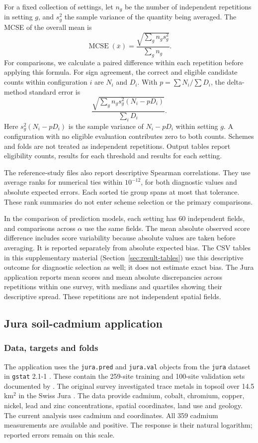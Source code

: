 \documentclass[11pt,a4paper]{article}
\begin{document}
For a fixed collection of settings, let $n_g$ be the number of independent repetitions in setting $g$, and $s_g^2$ the sample variance of the quantity being averaged. The MCSE of the overall mean is
\[
\operatorname{MCSE}(\overline x)=\frac{\sqrt{\sum_g n_g s_g^2}}{\sum_g n_g}.
\]
For comparisons, we calculate a paired difference within each repetition before applying this formula. For sign agreement, the correct and eligible candidate counts within configuration $i$ are $N_i$ and $D_i$. With $p=\sum N_i/\sum D_i$, the delta-method standard error is
\[\frac{\sqrt{\sum_g n_gs_g^2(N_i-pD_i)}}{\sum_i D_i}.\]
Here $s_g^2(N_i-pD_i)$ is the sample variance of $N_i-pD_i$ within setting $g$. A configuration with no eligible evaluation contributes zero to both counts. Schemes and folds are not treated as independent repetitions. Output tables report eligibility counts, results for each threshold and results for each setting.

The reference-study files also report descriptive Spearman correlations. They use average ranks for numerical ties within $10^{-12}$, for both diagnostic values and absolute expected errors. Each sorted tie group spans at most that tolerance. These rank summaries do not enter scheme selection or the primary comparisons.

In the comparison of prediction models, each setting has 60 independent fields, and comparisons across $\alpha$ use the same fields. The mean absolute observed score difference includes score variability because absolute values are taken before averaging. It is reported separately from absolute expected bias. The CSV tables in this supplementary material (Section~\ref{sec:result-tables}) use this descriptive outcome for diagnostic selection as well; it does not estimate exact bias. The Jura application reports mean scores and mean absolute discrepancies across repetitions within one survey, with medians and quartiles showing their descriptive spread. These repetitions are not independent spatial fields.

\subsection{Jura soil-cadmium application}
\label{sec:jura}
\subsubsection{Data, targets and folds}
\label{sec:jura-design}
The application uses the \texttt{jura.pred} and \texttt{jura.val} objects from the \texttt{jura} dataset in \texttt{gstat} 2.1-1 \citep{pebesma2004gstat}. These contain the 259-site training and 100-site validation sets documented by \citet{goovaerts1997geostatistics}. The original survey investigated trace metals in topsoil over 14.5 km$^2$ in the Swiss Jura \citep{atteia1994jura}. The data provide cadmium, cobalt, chromium, copper, nickel, lead and zinc concentrations, spatial coordinates, land use and geology. The current analysis uses cadmium and coordinates. All 359 cadmium measurements are available and positive. The response is their natural logarithm; reported errors remain on this scale.
\end{document}
